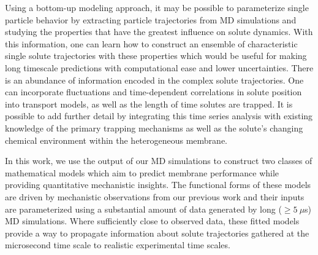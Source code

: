 \documentclass[journal=jctcce,manuscript=article]{achemso}
\begin{document}
  Using a bottom-up modeling approach, it may be possible to parameterize single
  particle behavior by extracting particle trajectories from MD simulations and
  studying the properties that have the greatest influence on solute dynamics.
  With this information, one can learn how to construct an ensemble of characteristic
  single solute trajectories with these properties which would be useful for
  making long timescale predictions with computational ease and lower
  uncertainties. 
  There is an abundance of information encoded in
  the complex solute trajectories. One can incorporate fluctuations and 
  time-dependent correlations in solute position into transport models, 
  as well as the length of time solutes are trapped. It is possible to add further
  detail by integrating this time series analysis with existing knowledge of the
  primary trapping mechanisms as well as the solute's changing chemical environment
  within the heterogeneous membrane. 

  In this work, we use the output of our MD simulations to construct two
  classes of mathematical models which aim to predict membrane performance
  while providing quantitative mechanistic insights. The functional forms of
  these models are driven by mechanistic observations from our previous work and
  their inputs are parameterized using a substantial amount of data generated
  by long ($\geq 5~\mu$s) MD simulations. 
  Where sufficiently close to observed data, these fitted models
  provide a way to propagate information about solute trajectories gathered 
  at the microsecond time scale to realistic experimental time scales. 
\end{document}

